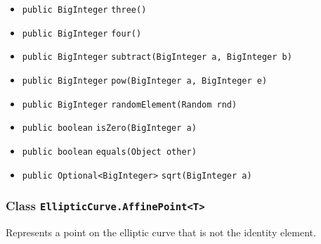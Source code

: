 \begin{itemize}
\item \lstinline|public BigInteger| \lstinline|three|\lstinline|()| \\[-0.6em]




\item \lstinline|public BigInteger| \lstinline|four|\lstinline|()| \\[-0.6em]




\item \lstinline|public BigInteger| \lstinline|subtract|\lstinline|(BigInteger a, BigInteger b)| \\[-0.6em]




\item \lstinline|public BigInteger| \lstinline|pow|\lstinline|(BigInteger a, BigInteger e)| \\[-0.6em]




\item \lstinline|public BigInteger| \lstinline|randomElement|\lstinline|(Random rnd)| \\[-0.6em]




\item \lstinline|public boolean| \lstinline|isZero|\lstinline|(BigInteger a)| \\[-0.6em]




\item \lstinline|public boolean| \lstinline|equals|\lstinline|(Object other)| \\[-0.6em]




\item \lstinline|public Optional<BigInteger>| \lstinline|sqrt|\lstinline|(BigInteger a)| \\[-0.6em]




\end{itemize}

\subsubsection{Class \lstinline|EllipticCurve.AffinePoint<T>|}
Represents a point on the elliptic curve that is not the identity
 element. \\
\noindent\begin{minipage}[t]{5cm}
\vspace{0.3em}
\hspace*{2em}
\vspace{0.3em}
\end{minipage}

